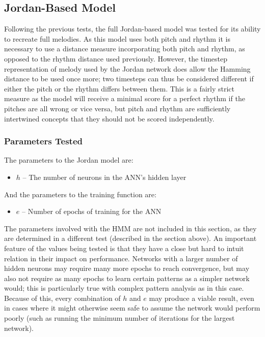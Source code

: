 \documentclass[ author={Stephen Livermore-Tozer},
				supervisor={Dr. Peter Flach},
				degree={MEng},
				title={Algorithmic Co-composition Using Machine Learning},
				subtitle={},
				type={research},
				year={2016} ]{dissertation}
\begin{document}
	\subsection{Jordan-Based Model}
	
	Following the previous tests, the full Jordan-based model was tested for its ability to recreate full melodies. As this model uses both pitch and rhythm it is necessary to use a distance measure incorporating both pitch and rhythm, as opposed to the rhythm distance used previously. However, the timestep representation of melody used by the Jordan network does allow the Hamming distance to be used once more; two timesteps can thus be considered different if either the pitch or the rhythm differs between them. This is a fairly strict measure as the model will receive a minimal score for a perfect rhythm if the pitches are all wrong or vice versa, but pitch and rhythm are sufficiently intertwined concepts that they should not be scored independently.
	
	\subsubsection{Parameters Tested}
	
	The parameters to the Jordan model are:
	\begin{itemize}
		\item $h$ -- The number of neurons in the ANN's hidden layer
	\end{itemize}
	And the parameters to the training function are:
	\begin{itemize}
		\item $e$ -- Number of epochs of training for the ANN
	\end{itemize}
	
	The parameters involved with the HMM are not included in this section, as they are determined in a different test (described in the section above). An important feature of the values being tested is that they have a close but hard to intuit relation in their impact on performance. Networks with a larger number of hidden neurons may require many more epochs to reach convergence, but may also not require as many epochs to learn certain patterns as a simpler network would; this is particularly true with complex pattern analysis as in this case. Because of this, every combination of $h$ and $e$ may produce a viable result, even in cases where it might otherwise seem safe to assume the network would perform poorly (such as running the minimum number of iterations for the largest network).
	
\end{document}

